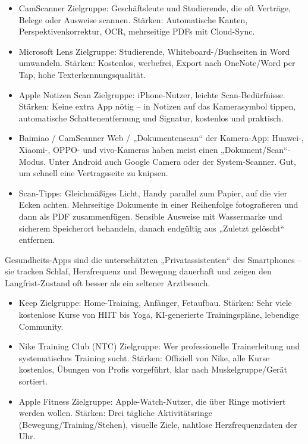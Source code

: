 \begin{itemize}
  \item CamScanner Zielgruppe: Geschäftsleute und Studierende, die oft Verträge, Belege oder Ausweise scannen. Stärken: Automatische Kanten, Perspektivenkorrektur, OCR, mehrseitige PDFs mit Cloud-Sync.
  \item Microsoft Lens Zielgruppe: Studierende, Whiteboard-/Buchseiten in Word umwandeln. Stärken: Kostenlos, werbefrei, Export nach OneNote/Word per Tap, hohe Texterkennungsqualität.
  \item Apple Notizen Scan Zielgruppe: iPhone-Nutzer, leichte Scan-Bedürfnisse. Stärken: Keine extra App nötig – in Notizen auf das Kamerasymbol tippen, automatische Schattenentfernung und Signatur, kostenlos und praktisch.
  \item Baimiao / CamScanner Web / „Dokumentenscan“ der Kamera-App: Huawei-, Xiaomi-, OPPO- und vivo-Kameras haben meist einen „Dokument/Scan“-Modus. Unter Android auch Google Camera oder der System-Scanner. Gut, um schnell eine Vertragsseite zu knipsen.
  \item Scan-Tipps: Gleichmäßiges Licht, Handy parallel zum Papier, auf die vier Ecken achten. Mehrseitige Dokumente in einer Reihenfolge fotografieren und dann als PDF zusammenfügen. Sensible Ausweise mit Wassermarke und sicherem Speicherort behandeln, danach endgültig aus „Zuletzt gelöscht“ entfernen.
\end{itemize}


Gesundheits-Apps sind die unterschätzten „Privatassistenten“ des Smartphones – sie tracken Schlaf, Herzfrequenz und Bewegung dauerhaft und zeigen den Langfrist-Zustand oft besser als ein seltener Arztbesuch.


\begin{itemize}
  \item Keep Zielgruppe: Home-Training, Anfänger, Fetaufbau. Stärken: Sehr viele kostenlose Kurse von HIIT bis Yoga, KI-generierte Trainingspläne, lebendige Community.
  \item Nike Training Club (NTC) Zielgruppe: Wer professionelle Trainerleitung und systematisches Training sucht. Stärken: Offiziell von Nike, alle Kurse kostenlos, Übungen von Profis vorgeführt, klar nach Muskelgruppe/Gerät sortiert.
  \item Apple Fitness Zielgruppe: Apple-Watch-Nutzer, die über Ringe motiviert werden wollen. Stärken: Drei tägliche Aktivitätsringe (Bewegung/Training/Stehen), visuelle Ziele, nahtlose Herzfrequenzdaten der Uhr.
\end{itemize}

